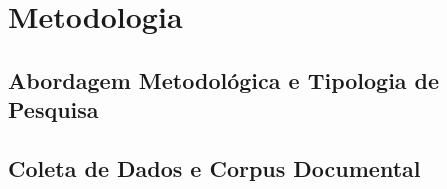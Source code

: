 
\section{Metodologia}
\label{sec:metodologia}

\subsection{Abordagem Metodológica e Tipologia de Pesquisa}
\label{subsec:metodologia_abordagem}


\subsection{Coleta de Dados e Corpus Documental}
\label{subsec:metodologia_coleta}


